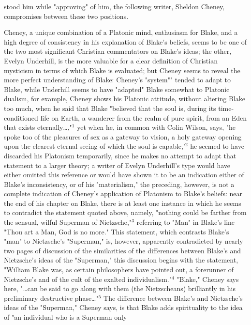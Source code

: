 \noindent stood him while "approving" of him, the
following writer, Sheldon Cheney, compromises between these two positions.\par
\vspace*{0.5\baselineskip}
Cheney, a unique combination of a Platonic mind, enthusiasm for Blake, and a high degree of consistency in his explanation
of Blake's beliefs, seems to be one of the two most significant Christian commentators on Blake's ideas; the other,
Evelyn Underhill, is the more valuable for a clear definition of Christian mysticism in terms of which Blake is evaluated;
but Cheney seems to reveal the more perfect understanding of Blake: Cheney's "system"" tended
to adapt to Blake, while Underhill seems to have "adapted" Blake somewhat to Platonic dualism,
for example, Cheney shows his Platonic attitude, without altering Blake too much, when he said that
Blake "believed that the soul is, during its time-conditioned life on Earth, a wanderer from
the realm of pure spirit, from an Eden that exists eternally\dots,"$^{1}$ yet when he, in common
with Colin Wilson, says, "he spoke too of the pleasures of sex as a gateway to vision, a holy gateway
opening upon the clearest eternal seeing of which the soul is capable,'$^{2}$ he seemed to have discarded
his Platonism temporarily, since he makes no attempt to adapt that statement to a larger theory; a
writer of Evelyn Underhill's type would have either omitted this reference or would have shown it to be an indication
either of Blake's inconsistency, or of his "materialism," the preceding, however, is not a complete indication
of Cheney's application of Platonism to Blake's beliefs: near the end of his chapter on Blake, there is at least one
instance in which he seems to contradict the statement quoted above, namely, "nothing could be farther from the sensual, wilful Superman
of Nietzsche,"$^{3}$ referring to "Man" in Blake's line "Thou art a Man, God is no more." This statement, which
contrasts Blake's "man" to Nietzsche's "Superman," is, however, apparently contradicted by nearly two pages of discussion
of the similarities of the differences between Blake's and Nietzsche's ideas of the "Superman," this discussion
begins with the statement, "William Blake was, as certain philosophers have pointed out, a forerunner of Nietzsche's and
of the cult of the exalted individualism."$^{4}$ "Blake," Cheney says here, "\dots can be said to go along with them (the Nietzscheans)
brilliantly in his preliminary destructive phase\dots"$^{5}$ The difference between Blake's and Nietzsche's ideas
of the "Superman," Cheney says, is that Blake adds spirituality to the idea of "an individual who is a Superman only
